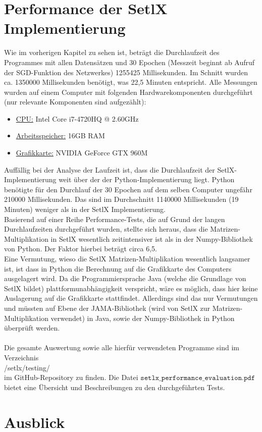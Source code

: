 \section{Performance der SetlX Implementierung}
Wie im vorherigen Kapitel zu sehen ist, beträgt die Durchlaufzeit des Programmes mit allen Datensätzen und 30 Epochen (Messzeit beginnt ab Aufruf der SGD-Funktion des Netzwerkes) 1255425 Millisekunden. Im Schnitt wurden ca. 1350000 Millisekunden benötigt, was 22,5 Minuten entspricht. Alle Messungen wurden auf einem Computer mit folgenden Hardwarekomponenten durchgeführt (nur relevante Komponenten sind aufgezählt):
\begin{itemize}
	\item \underline{CPU:} Intel Core i7-4720HQ @ 2.60GHz
	\item \underline{Arbeitsspeicher:} 16GB RAM
	\item \underline{Grafikkarte:} NVIDIA GeForce GTX 960M
\end{itemize}
Auffällig bei der Analyse der Laufzeit ist, dass die Durchlaufzeit der SetlX-Implementierung weit über der der Python-Implementierung liegt. Python benötigte für den Durchlauf der 30 Epochen auf dem selben Computer ungefähr 210000 Millisekunden. Das sind im Durchschnitt 1140000 Millisekunden (19 Minuten) weniger als in der SetlX Implementierung. \\
Basierend auf einer Reihe Performance-Tests, die auf Grund der langen Durchlaufzeiten durchgeführt wurden, stellte sich heraus, dass die Matrizen-Multiplikation in SetlX wesentlich zeitintensiver ist als in der Numpy-Bibliothek von Python. Der Faktor hierbei beträgt circa 6,5. \\
Eine Vermutung, wieso die SetlX Matrizen-Multiplikation wesentlich langsamer ist, ist dass in Python die Berechnung auf die Grafikkarte des Computers ausgelagert wird. Da die Programmiersprache Java (welche die Grundlage von SetlX bildet) plattformunabhängigkeit verspricht, wäre es möglich, dass hier keine Auslagerung auf die Grafikkarte stattfindet. Allerdings sind das nur Vermutungen und müssten auf Ebene der JAMA-Bibliothek (wird von SetlX zur Matrizen-Multiplikation verwendet) in Java, sowie der Numpy-Bibliothek in Python überprüft werden. \\ \\
Die gesamte Auswertung sowie alle hierfür verwendeten Programme sind im Verzeichnis
\\[0.2cm]
\hspace*{1.3cm}
/setlx/testing/
\\[0.2cm]
im GitHub-Repository zu finden. Die Datei $\mathtt{setlx\_performance\_evaluation.pdf}$ bietet eine Übersicht und Beschreibungen zu den durchgeführten Tests.

\section{Ausblick}